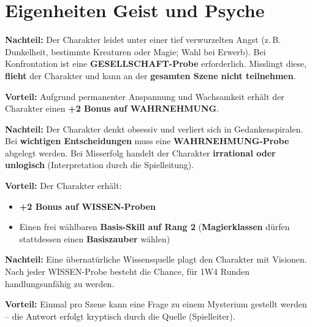 \section{Eigenheiten Geist und Psyche}

\begin{traitbox}{}
	
	\textbf{Nachteil:}  
	Der Charakter leidet unter einer tief verwurzelten Angst
	(z.\,B. Dunkelheit, bestimmte Kreaturen oder Magie; Wahl bei Erwerb).
	Bei Konfrontation ist eine \textbf{GESELLSCHAFT-Probe} erforderlich.
	Misslingt diese, \textbf{flieht} der Charakter und kann an der
	\textbf{gesamten Szene nicht teilnehmen}.
	
	\medskip
	\textbf{Vorteil:}  
	Aufgrund permanenter Anspannung und Wachsamkeit erhält der Charakter
	einen \textbf{+2 Bonus auf WAHRNEHMUNG}.
	
\end{traitbox}

\begin{traitbox}{}
	
	\textbf{Nachteil:}  
	Der Charakter denkt obsessiv und verliert sich in Gedankenspiralen.
	Bei \textbf{wichtigen Entscheidungen} muss eine
	\textbf{WAHRNEHMUNG-Probe} abgelegt werden.
	Bei Misserfolg handelt der Charakter \textbf{irrational oder unlogisch}
	(Interpretation durch die Spielleitung).
	
	\medskip
	\textbf{Vorteil:}  
	Der Charakter erhält:
	\begin{itemize}
		\item \textbf{+2 Bonus auf WISSEN-Proben}
		\item Einen frei wählbaren \textbf{Basis-Skill auf Rang 2}  
		(\textbf{Magierklassen} dürfen stattdessen einen \textbf{Basiszauber} wählen)
	\end{itemize}
	
\end{traitbox}

\begin{traitbox}{}
	
	\medskip
	\textbf{Nachteil:}
	Eine übernatürliche Wissensquelle plagt den Charakter mit Visionen. Nach jeder WISSEN-Probe besteht die Chance, für 1W4 Runden handlungsunfähig zu werden. 

	\medskip
	\textbf{Vorteil:}
	Einmal pro Szene kann eine Frage zu einem Mysterium gestellt werden – die Antwort erfolgt kryptisch durch die Quelle (Spielleiter).
	
\end{traitbox}

